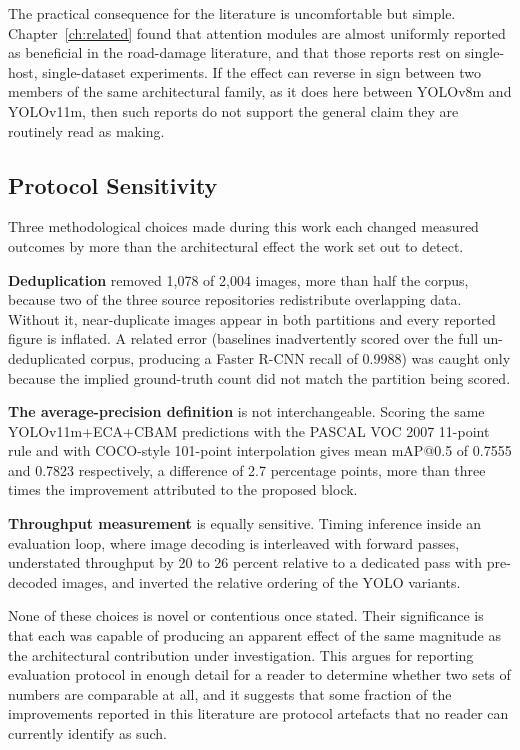 \documentclass[MScCS]{uccthesis}
\begin{document}
The practical consequence for the literature is uncomfortable but simple.
Chapter~\ref{ch:related} found that attention modules are almost uniformly
reported as beneficial in the road-damage literature, and that those reports
rest on single-host, single-dataset experiments. If the effect can reverse in
sign between two members of the same architectural family, as it does here
between YOLOv8m and YOLOv11m, then such reports do not support the general
claim they are routinely read as making.


\subsection{Protocol Sensitivity}
\label{sec:disc_protocol}

Three methodological choices made during this work each changed measured
outcomes by more than the architectural effect the work set out to detect.

\textbf{Deduplication} removed 1,078 of 2,004 images, more than half the
corpus, because two of the three source repositories redistribute overlapping
data. Without it, near-duplicate images appear in both partitions and every
reported figure is inflated. A related error (baselines inadvertently scored
over the full un-deduplicated corpus, producing a Faster R-CNN recall of 0.9988) was caught only because the implied ground-truth count did not match the
partition being scored.

\textbf{The average-precision definition} is not interchangeable. Scoring the
same YOLOv11m+ECA+CBAM predictions with the PASCAL VOC 2007 11-point rule and
with COCO-style 101-point interpolation gives mean mAP@0.5 of 0.7555 and
0.7823 respectively, a difference of 2.7 percentage points, more than three
times the improvement attributed to the proposed block.

\textbf{Throughput measurement} is equally sensitive. Timing inference inside
an evaluation loop, where image decoding is interleaved with forward passes,
understated throughput by 20 to 26 percent relative to a dedicated pass with
pre-decoded images, and inverted the relative ordering of the YOLO variants.

None of these choices is novel or contentious once stated. Their significance
is that each was capable of producing an apparent effect of the same magnitude
as the architectural contribution under investigation. This argues for
reporting evaluation protocol in enough detail for a reader to determine
whether two sets of numbers are comparable at all, and it suggests that some
fraction of the improvements reported in this literature are protocol artefacts
that no reader can currently identify as such.
\end{document}

